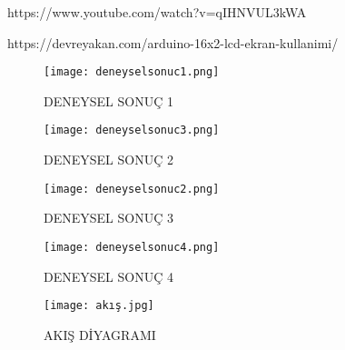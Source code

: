 \documentclass[conference]{IEEEtran}
\begin{document}
https://www.youtube.com/watch?v=qIHNVUL3kWA

https://devreyakan.com/arduino-16x2-lcd-ekran-kullanimi/


\begin{figure}[p]
\centering
\texttt{[image: deneyselsonuc1.png]}
\caption{DENEYSEL SONUÇ 1}
\label{fig2}
\end{figure}

\begin{figure}[t]
\centering
\texttt{[image: deneyselsonuc3.png]}
\caption{DENEYSEL SONUÇ 2}
\label{fig1}
\end{figure}

\begin{figure}[t]
\centering
\texttt{[image: deneyselsonuc2.png]}
\caption{DENEYSEL SONUÇ 3}
\label{fig1}
\end{figure}

\begin{figure}[t]
\centering
\texttt{[image: deneyselsonuc4.png]}
\caption{DENEYSEL SONUÇ 4}
\label{fig1}
\end{figure}

\begin{figure}[p]
\centering
\texttt{[image: akış.jpg]}
\caption{AKIŞ DİYAGRAMI}
\label{fig2}
\end{figure}
\end{document}
